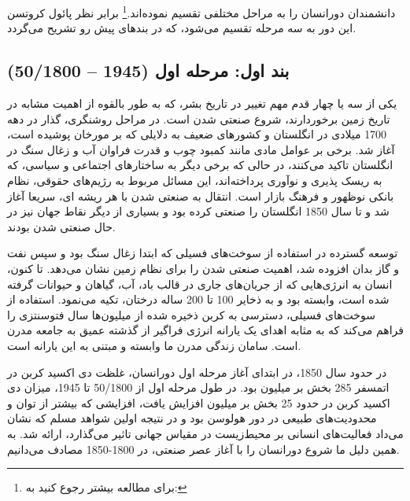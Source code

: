 دانشمندان دورانسان را به مراحل مختلفی تقسیم نموده‌اند.\footnote{برای مطالعه بیشتر رجوع کنید به:
} برابر نظر پائول کروتسن این دور به سه مرحله تقسیم می‌شود، که در بند‌های پیش رو تشریح می‌گردد.
	\subsection*{بند اول: مرحله اول (1945 – 50/1800)}
یکی از سه یا چهار قدم مهم تغییر در تاریخ بشر، که به طور بالقوه از اهمیت مشابه در تاریخ زمین برخوردارند، شروع صنعتی شدن است. در مراحل روشنگری، گذار در دهه 1700 میلادی در انگلستان و کشورهای ضعیف به دلایلی که بر مورخان پوشیده است، آغاز شد. برخی بر عوامل مادی مانند کمبود چوب و قدرت فراوان آب و زغال سنگ در انگلستان تاکید می‌کنند، در حالی که برخی دیگر به ساختارهای اجتماعی و سیاسی، که به ریسک پذیری و نوآوری پرداخته‌اند، این مسائل مربوط به رژیم‌های حقوقی، نظام بانکی نوظهور و فرهنگ بازار است. انتقال به صنعتی شدن با هر ریشه ای، سریعا آغاز شد و تا سال 1850 انگلستان را صنعتی کرده بود و بسیاری از دیگر نقاط جهان نیز در حال صنعتی شدن بودند.

توسعه گسترده در استفاده از سوخت‌های فسیلی که ابتدا زغال سنگ بود و سپس نفت و گاز بدان افزوده شد، اهمیت صنعتی شدن را برای نظام زمین نشان می‌دهد. تا کنون، انسان به انرژی‌هایی که از جریان‌های جاری در قالب باد، آب، گیاهان و حیوانات گرفته شده است، وابسته بود و به ذخایر 100 تا 200 ساله درختان، تکیه می‌نمود. استفاده از سوخت‌های فسیلی، دسترسی به کربن ذخیره شده از میلیون‌ها سال فتوسنتزی را فراهم می‌کند که به مثابه اهدای یک یارانه انرژی فراگیر  از گذشته عمیق به جامعه مدرن است. سامان زندگی مدرن ما وابسته و مبتنی به این یارانه است.

در حدود سال 1850، در ابتدای آغاز مرحله اول دورانسان، غلظت دی اکسید کربن در اتمسفر 285 بخش بر میلیون بود. در طول مرحله اول از 50/1800 تا 1945، میزان دی اکسید کربن در حدود 25 بخش بر میلیون افزایش یافت، افزایشی که بیشتر از توان و محدودیت‌های طبیعی در دور هولوسن بود و در نتیجه اولین شواهد مسلم که نشان می‌داد فعالیت‌های انسانی بر  محیط‌زیست در مقیاس جهانی تاثیر می‌گذارد، ارائه شد. به همین دلیل ما شروع دورانسان را با آغاز عصر صنعتی، در 1800-1850 مصادف می‌دانیم.
